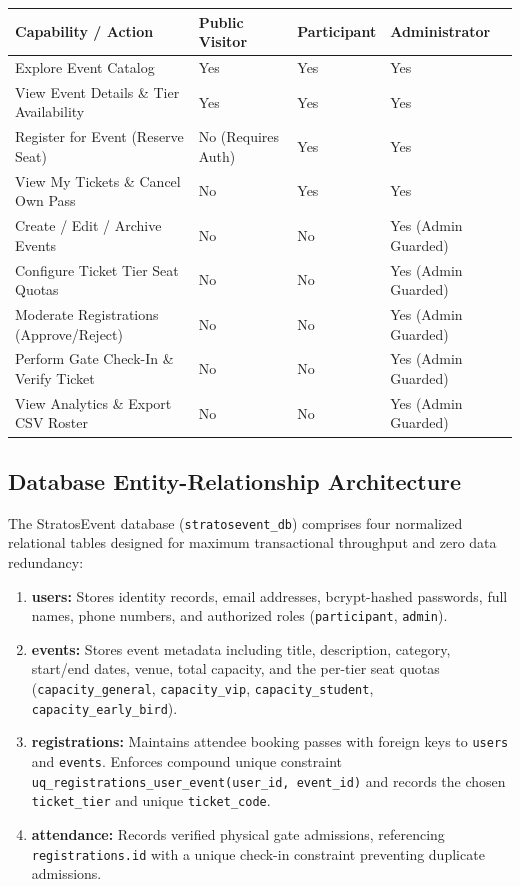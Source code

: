 \documentclass[11pt,a4paper]{article}
\begin{document}
\noindent
\begin{tabularx}{\textwidth}{|p{}|X|X|X|}
\hline
\rowcolor{TCSBlue}
\color{white}\bfseries Capability / Action & 
\color{white}\bfseries Public Visitor & 
\color{white}\bfseries Participant & 
\color{white}\bfseries Administrator \\
\hline
Explore Event Catalog & Yes & Yes & Yes \\
\hline
View Event Details \& Tier Availability & Yes & Yes & Yes \\
\hline
Register for Event (Reserve Seat) & No (Requires Auth) & Yes & Yes \\
\hline
View My Tickets \& Cancel Own Pass & No & Yes & Yes \\
\hline
Create / Edit / Archive Events & No & No & Yes (Admin Guarded) \\
\hline
Configure Ticket Tier Seat Quotas & No & No & Yes (Admin Guarded) \\
\hline
Moderate Registrations (Approve/Reject) & No & No & Yes (Admin Guarded) \\
\hline
Perform Gate Check-In \& Verify Ticket & No & No & Yes (Admin Guarded) \\
\hline
View Analytics \& Export CSV Roster & No & No & Yes (Admin Guarded) \\
\hline
\end{tabularx}
\endgroup

\vspace{0.20in}
\subsection*{Database Entity-Relationship Architecture}
\justifying

The StratosEvent database (\texttt{stratosevent\_db}) comprises four normalized relational tables designed for maximum transactional throughput and zero data redundancy:

\begin{enumerate}[leftmargin=*]
    \item \textbf{users:} Stores identity records, email addresses, bcrypt-hashed passwords, full names, phone numbers, and authorized roles (\texttt{participant}, \texttt{admin}).
    \item \textbf{events:} Stores event metadata including title, description, category, start/end dates, venue, total capacity, and the per-tier seat quotas (\texttt{capacity\_general}, \texttt{capacity\_vip}, \texttt{capacity\_student}, \texttt{capacity\_early\_bird}).
    \item \textbf{registrations:} Maintains attendee booking passes with foreign keys to \texttt{users} and \texttt{events}. Enforces compound unique constraint \texttt{uq\_registrations\_user\_event(user\_id, event\_id)} and records the chosen \texttt{ticket\_tier} and unique \texttt{ticket\_code}.
    \item \textbf{attendance:} Records verified physical gate admissions, referencing \texttt{registrations.id} with a unique check-in constraint preventing duplicate admissions.
\end{enumerate}
\end{document}
